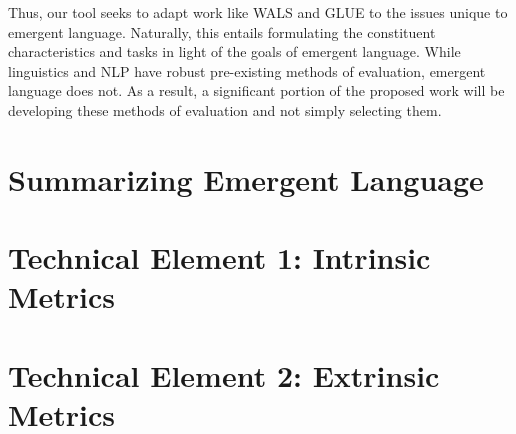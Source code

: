 Thus, our tool seeks to adapt work like WALS and GLUE to the issues unique to emergent language.
Naturally, this entails formulating the constituent characteristics and tasks in light of the goals of emergent language.
While linguistics and NLP have robust pre-existing methods of evaluation, emergent language does not.
As a result, a significant portion of the proposed work will be developing these methods of evaluation and not simply selecting them.





\section{Summarizing Emergent Language}

\section{Technical Element 1: Intrinsic Metrics}
\section{Technical Element 2: Extrinsic Metrics}
